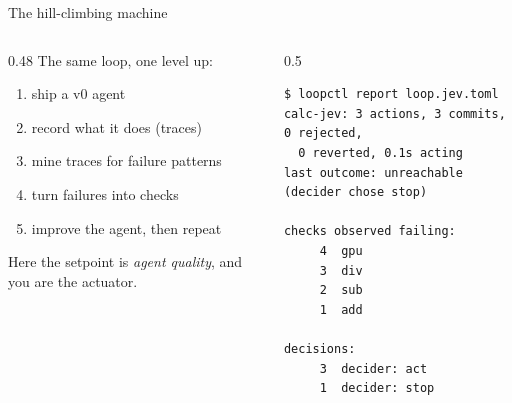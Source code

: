 \documentclass[aspectratio=169]{beamer}
\begin{document}
\begin{frame}[fragile]{The hill-climbing machine}
  \begin{columns}[T]
    \begin{column}{0.48\textwidth}
      The same loop, one level up:
      \begin{enumerate}
        \item ship a v0 agent
        \item record what it does (traces)
        \item mine traces for failure patterns
        \item turn failures into checks
        \item improve the agent, then repeat
      \end{enumerate}
      \small Here the setpoint is \emph{agent quality}, and you are the actuator.
    \end{column}
    \begin{column}{0.5\textwidth}
\begin{lstlisting}[style=termsm]
$ loopctl report loop.jev.toml
calc-jev: 3 actions, 3 commits, 0 rejected,
  0 reverted, 0.1s acting
last outcome: unreachable (decider chose stop)

checks observed failing:
     4  gpu
     3  div
     2  sub
     1  add

decisions:
     3  decider: act
     1  decider: stop
\end{lstlisting}
    \end{column}
  \end{columns}
\end{frame}
\end{document}
